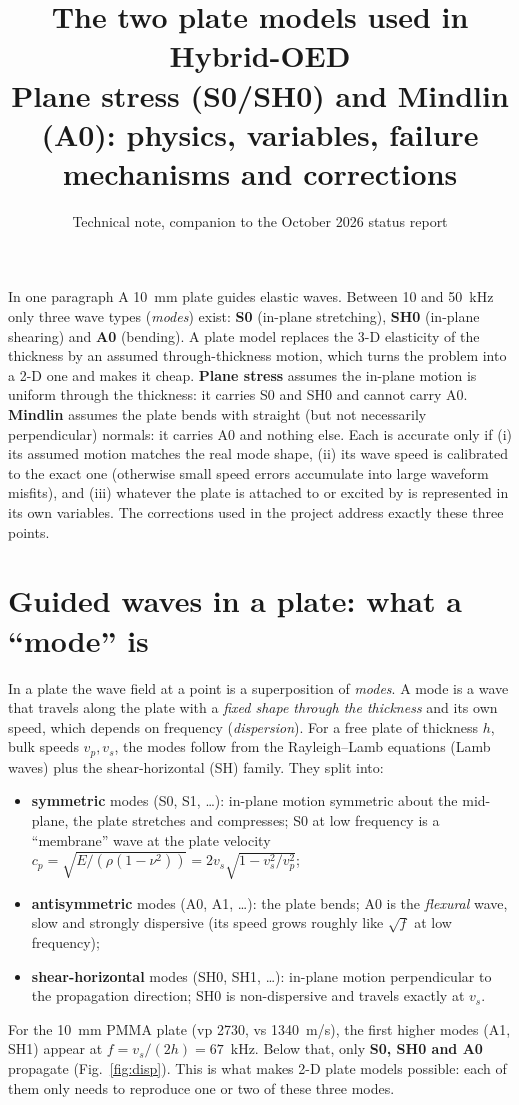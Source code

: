 \documentclass[11pt,a4paper]{article}
\title{\textbf{The two plate models used in Hybrid-OED}\\[4pt]
\large Plane stress (S0/SH0) and Mindlin (A0): physics, variables, failure mechanisms and corrections}
\author{Technical note, companion to the October 2026 status report}
\date{}
\begin{document}
\maketitle

\begin{keybox}{In one paragraph}
A 10~mm plate guides elastic waves. Between 10 and 50~kHz only three wave types (\emph{modes}) exist: \textbf{S0}
(in-plane stretching), \textbf{SH0} (in-plane shearing) and \textbf{A0} (bending). A plate model replaces the 3-D
elasticity of the thickness by an assumed through-thickness motion, which turns the problem into a 2-D one and makes
it cheap. \textbf{Plane stress} assumes the in-plane motion is uniform through the thickness: it carries S0 and SH0 and
cannot carry A0. \textbf{Mindlin} assumes the plate bends with straight (but not necessarily perpendicular) normals: it
carries A0 and nothing else. Each is accurate only if (i) its assumed motion matches the real mode shape, (ii) its
wave speed is calibrated to the exact one (otherwise small speed errors accumulate into large waveform misfits), and
(iii) whatever the plate is attached to or excited by is represented in its own variables. The corrections used in
the project address exactly these three points.
\end{keybox}

\tableofcontents

\section{Guided waves in a plate: what a ``mode'' is}
In a plate the wave field at a point is a superposition of \emph{modes}. A mode is a wave that travels along the
plate with a \emph{fixed shape through the thickness} and its own speed, which depends on frequency
(\emph{dispersion}). For a free plate of thickness $h$, bulk speeds $v_p, v_s$, the modes follow from the
Rayleigh--Lamb equations (Lamb waves) plus the shear-horizontal (SH) family. They split into:
\begin{itemize}
  \item \textbf{symmetric} modes (S0, S1, \ldots): in-plane motion symmetric about the mid-plane, the plate stretches and
        compresses; S0 at low frequency is a ``membrane'' wave at the plate velocity
        $c_p = \sqrt{E/(\rho(1-\nu^2))} = 2v_s\sqrt{1 - v_s^2/v_p^2}$;
  \item \textbf{antisymmetric} modes (A0, A1, \ldots): the plate bends; A0 is the \emph{flexural} wave, slow and strongly
        dispersive (its speed grows roughly like $\sqrt{f}$ at low frequency);
  \item \textbf{shear-horizontal} modes (SH0, SH1, \ldots): in-plane motion perpendicular to the propagation direction;
        SH0 is non-dispersive and travels exactly at $v_s$.
\end{itemize}
For the 10~mm PMMA plate (vp 2730, vs 1340~m/s), the first higher modes (A1, SH1) appear at $f = v_s/(2h) = 67$~kHz.
Below that, only \textbf{S0, SH0 and A0} propagate (Fig.~\ref{fig:disp}). This is what makes 2-D plate models possible:
each of them only needs to reproduce one or two of these three modes.
\end{document}
